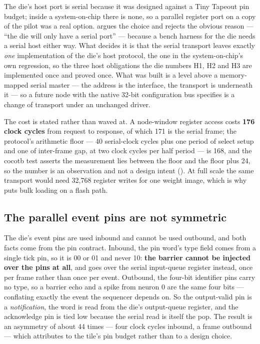 The die's host port is serial because it was designed against a Tiny
Tapeout pin budget; inside a system-on-chip there is none, so a
parallel register port on a copy of the pilot was a real option.
 argues the choice and rejects the obvious reason
--- ``the die will only have a serial port'' --- because a bench
harness for the die needs a serial host either way. What decides it is
that the serial transport leaves exactly \emph{one} implementation of
the die's host protocol, the one in the system-on-chip's own
regression, so the three host obligations the die numbers H1, H2 and H3
are implemented once and proved once. What was built is a level above a
memory-mapped serial master --- the address is the interface, the
transport is underneath it --- so a future node with the native 32-bit
configuration bus  specifies is a change of
transport under an unchanged driver.

The cost is stated rather than waved at. A node-window register access
costs \textbf{176 clock cycles} from request to response, of which 171
is the serial frame; the protocol's arithmetic floor --- 40
serial-clock cycles plus one period of select setup and one of
inter-frame gap, at two clock cycles per half period --- is 168, and
the cocotb test asserts the measurement lies between the floor and the
floor plus 24, so the number is an observation and not a design intent
(). At full scale the same transport would need
32,768 register writes for one weight image, which is why
 puts bulk loading on a flash path.

\subsection{The parallel event pins are not symmetric}

The die's event pins are used inbound and cannot be used outbound, and
both facts come from the pin contract. Inbound, the pin word's type
field comes from a single tick pin, so it is 00 or 01 and never 10:
\textbf{the barrier cannot be injected over the pins at all}, and goes
over the serial input-queue register instead, once per frame rather
than once per event. Outbound, the four-bit identifier pins carry no
type, so a barrier echo and a spike from neuron 0 are the same four
bits --- conflating exactly the event the sequencer depends on. So the
output-valid pin is a \emph{notification}, the word is read from the
die's output-queue register, and the acknowledge pin is tied low
because the serial read is itself the pop. The result is an asymmetry
of about 44 times --- four clock cycles inbound, a frame outbound ---
which  attributes to the tile's pin budget rather
than to a design choice.

